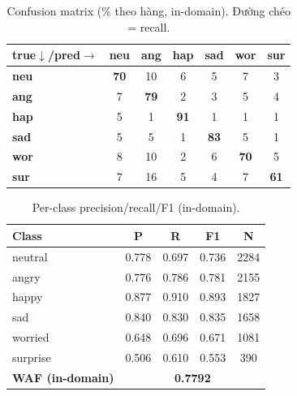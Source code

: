 \documentclass[10pt]{article}
\begin{document}
\begin{table}[H]\centering\footnotesize\setlength{\tabcolsep}{4pt}
\begin{tabular}{lcccccc}
\toprule
\textbf{true$\downarrow$/pred$\rightarrow$} & \textbf{neu} & \textbf{ang} & \textbf{hap} & \textbf{sad} & \textbf{wor} & \textbf{sur} \\
\midrule
\textbf{neu} & \cellcolor{cmblue!49}\textbf{70} & \cellcolor{cmblue!7}10 & \cellcolor{cmblue!4}6 & \cellcolor{cmblue!3}5 & \cellcolor{cmblue!5}7 & \cellcolor{cmblue!2}3 \\
\textbf{ang} & \cellcolor{cmblue!5}7 & \cellcolor{cmblue!55}\textbf{79} & \cellcolor{cmblue!1}2 & \cellcolor{cmblue!2}3 & \cellcolor{cmblue!4}5 & \cellcolor{cmblue!3}4 \\
\textbf{hap} & \cellcolor{cmblue!4}5 & \cellcolor{cmblue!1}1 & \cellcolor{cmblue!64}\textbf{91} & \cellcolor{cmblue!0}1 & \cellcolor{cmblue!1}1 & \cellcolor{cmblue!1}1 \\
\textbf{sad} & \cellcolor{cmblue!4}5 & \cellcolor{cmblue!3}5 & \cellcolor{cmblue!1}1 & \cellcolor{cmblue!58}\textbf{83} & \cellcolor{cmblue!4}5 & \cellcolor{cmblue!1}1 \\
\textbf{wor} & \cellcolor{cmblue!6}8 & \cellcolor{cmblue!7}10 & \cellcolor{cmblue!1}2 & \cellcolor{cmblue!4}6 & \cellcolor{cmblue!49}\textbf{70} & \cellcolor{cmblue!3}5 \\
\textbf{sur} & \cellcolor{cmblue!5}7 & \cellcolor{cmblue!11}16 & \cellcolor{cmblue!4}5 & \cellcolor{cmblue!3}4 & \cellcolor{cmblue!5}7 & \cellcolor{cmblue!43}\textbf{61} \\
\bottomrule
\end{tabular}
\caption{Confusion matrix (\% theo hàng, in-domain). Đường chéo = recall.}
\end{table}

\begin{table}[H]\centering\footnotesize
\begin{tabular}{lcccc}
\toprule
\textbf{Class} & \textbf{P} & \textbf{R} & \textbf{F1} & \textbf{N} \\
\midrule
neutral & 0.778 & 0.697 & 0.736 & 2284 \\
angry & 0.776 & 0.786 & 0.781 & 2155 \\
happy & 0.877 & 0.910 & 0.893 & 1827 \\
sad & 0.840 & 0.830 & 0.835 & 1658 \\
worried & 0.648 & 0.696 & 0.671 & 1081 \\
surprise & 0.506 & 0.610 & 0.553 & 390 \\
\midrule
\textbf{WAF (in-domain)} & \multicolumn{4}{c}{\textbf{0.7792}} \\
\bottomrule
\end{tabular}
\caption{Per-class precision/recall/F1 (in-domain).}
\end{table}
\end{document}
